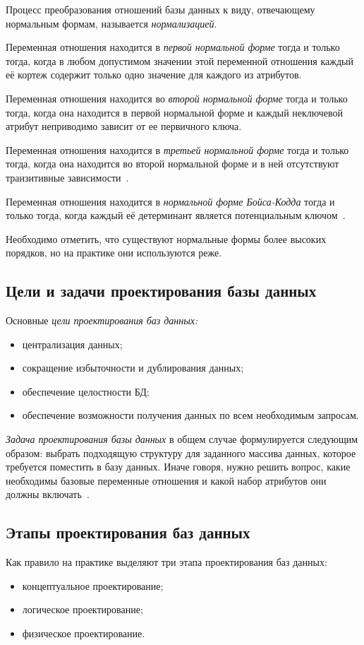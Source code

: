 Процесс преобразования отношений базы данных к виду, отвечающему нормальным формам,
называется \textit{нормализацией}.

Переменная отношения находится в \textit{первой нормальной форме} тогда и только
тогда, когда в любом допустимом значении этой переменной отношения каждый её кортеж
содержит только одно значение для каждого из атрибутов.

Переменная отношения находится во \textit{второй нормальной форме} тогда и только тогда,
когда она находится в первой нормальной форме и каждый неключевой атрибут
неприводимо зависит от ее первичного ключа.

Переменная отношения находится в \textit{третьей нормальной форме} тогда и только
тогда, когда она находится во второй нормальной форме и в ней отсутствуют транзитивные
зависимости~\cite{date05}.

Переменная отношения находится в \textit{нормальной форме Бойса-Кодда} тогда и только тогда,
когда каждый её детерминант является потенциальным ключом~\cite{konnolli03}.

Необходимо отметить, что существуют нормальные формы более высоких порядков, но
на практике они используются реже.

\subsection{Цели и задачи проектирования базы данных}
\label{sub:db_structure_aims}

Основные \textit{цели проектирования баз данных:}
\begin{itemize}
  \item централизация данных;
  \item сокращение избыточности и дублирования данных;
  \item обеспечение целостности БД;
  \item обеспечение возможности получения данных по всем необходимым запросам.
\end{itemize}

\textit{Задача проектирования базы данных} в общем случае формулируется следующим образом: выбрать
подходящую структуру для заданного массива данных, которое требуется поместить в базу данных.
Иначе говоря, нужно решить вопрос, какие необходимы базовые переменные отношения и какой
набор атрибутов они должны включать~\cite{date05}.

\subsection{Этапы проектирования баз данных}
\label{sub:db_structure_stages}
Как правило на практике выделяют три этапа проектирования баз данных:
\begin{itemize}
  \item концептуальное проектирование;
  \item логическое проектирование;
  \item физическое проектирование.
\end{itemize}

